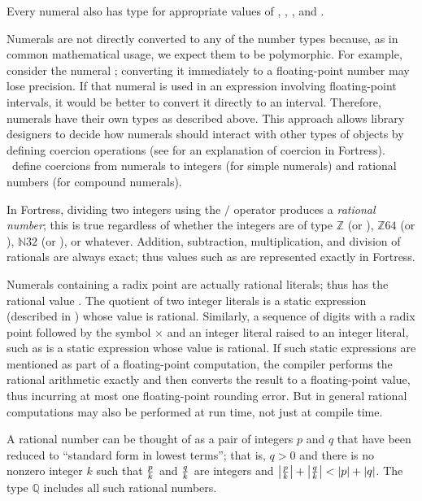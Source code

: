Every numeral also has type
for appropriate values of , , , and .


Numerals are not directly converted to any of the number types
because, as in common mathematical usage,
we expect them to be polymorphic.
For example, consider the numeral ;
converting it immediately to a floating-point number
may lose precision.
If that numeral is used in an expression
involving floating-point intervals,
it would be better to convert it directly to an interval.
Therefore, numerals have their own types as described above.
This approach allows library designers to decide how numerals should
interact with other types of objects by defining coercion operations
(see  for an explanation of coercion
in Fortress).
\Library\ define coercions
from numerals to integers (for simple numerals)
and rational numbers (for compound numerals).


In Fortress, dividing two integers using the $/$ operator produces
a \emph{rational number}; this is true regardless of whether
the integers are of type $\mathbb{Z}$ (or ),
$\mathbb{Z}64$ (or ), $\mathbb{N}32$ (or ), or
whatever.  Addition, subtraction, multiplication, and division of rationals
are always exact; thus values such as  are represented exactly in
Fortress.

Numerals containing a radix point are actually rational
literals; thus  has the rational value .
The quotient of two integer literals is a static expression
(described in ) whose value is rational.
Similarly, a sequence of digits with a radix point followed by the symbol
$\times$ and an integer literal raised to an integer literal,
such as 
is a static expression whose value is rational.
If such static expressions are mentioned as part of a floating-point
computation, the compiler performs the rational arithmetic exactly and then
converts the result to a floating-point value, thus incurring
at most one floating-point rounding error.
But in general rational computations may also be performed at run time,
not just at compile time.

A rational number can be thought of as a pair of integers $p$ and $q$
that have been reduced to ``standard form in lowest terms'';
that is, $q > 0$ and there is no nonzero integer $k$
such that $p \over k$ and $q \over k$ are integers
and $\left| {p \over k} \right| + \left| {q \over k} \right|
	< \left| p \right| + \left| q \right|$.
The type $\mathbb{Q}$ includes all such rational numbers.

